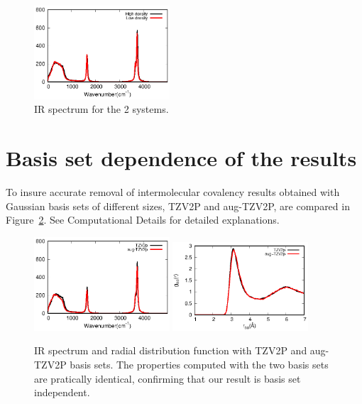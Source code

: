 \documentclass[aps,prl,reprint,amsmath,amssymb]{revtex4-1}
\begin{document}
\begin{figure}
\includegraphics[width=0.45\textwidth]{cp_ir}
\caption{IR spectrum for the 2 systems.}\label{Fig:ir_cp}
\end{figure} 

\section{Basis set dependence of the results} 

To insure accurate removal of intermolecular covalency results obtained with Gaussian basis sets of different sizes, TZV2P and aug-TZV2P, are compared in Figure~\ref{Fig:basis}. See Computational Details for detailed explanations.

\begin{figure}
\includegraphics[width=0.45\textwidth]{basis_ir}
\includegraphics[width=0.45\textwidth]{basis_rdf}
\caption{IR spectrum and radial distribution function with TZV2P and aug-TZV2P basis sets. The properties computed with the two basis sets are pratically identical, confirming that our result is basis set independent.}\label{Fig:basis}
\end{figure} 

\fi %
\end{document}
